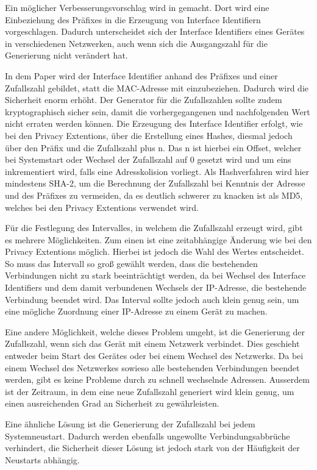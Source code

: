 \documentclass[a4paper, 12pt]{scrartcl}
\begin{document}
Ein möglicher Verbesserungsvorschlag wird in \cite{Paper} gemacht. Dort wird eine Einbeziehung des Präfixes in die Erzeugung von Interface Identifiern vorgeschlagen.
Dadurch unterscheidet sich der Interface Identifiers eines Gerätes in verschiedenen Netzwerken, auch wenn sich die Ausgangszahl für die Generierung nicht verändert hat.

In dem Paper wird der Interface Identifier anhand des Präfixes und einer Zufallszahl gebildet, statt die MAC-Adresse mit einzubeziehen.
Dadurch wird die Sicherheit enorm erhöht.
Der Generator für die Zufallszahlen sollte zudem kryptographisch sicher sein, damit die vorhergegangenen und nachfolgenden Wert nicht erraten werden können.
Die Erzeugung des Interface Identifier erfolgt, wie bei den Privacy Extentions, über die Erstellung eines Hashes, diesmal jedoch über den Präfix und die Zufallszahl plus n.
Das n ist hierbei ein Offset, welcher bei Systemstart oder Wechsel der Zufallszahl auf 0 gesetzt wird und um eins inkrementiert wird, falls eine Adresskolision vorliegt.
Als Hashverfahren wird hier mindestens SHA-2, um die Berechnung der Zufallszahl bei Kenntnis der Adresse und des Präfixes zu vermeiden, da es deutlich schwerer zu knacken ist als MD5, welches bei den Privacy Extentions verwendet wird.

Für die Festlegung des Intervalles, in welchem die Zufallszahl erzeugt wird, gibt es mehrere Möglichkeiten.
Zum einen ist eine zeitabhängige Änderung wie bei den Privacy Extentions möglich.
Hierbei ist jedoch die Wahl des Wertes entscheidet. So muss das Intervall so groß gewählt werden, dass die bestehenden Verbindungen nicht zu stark beeinträchtigt werden, da bei Wechsel des Interface Identifiers und dem damit verbundenen Wechsels der IP-Adresse, die bestehende Verbindung beendet wird.
Das Interval sollte jedoch auch klein genug sein, um eine mögliche Zuordnung einer IP-Adresse zu einem Gerät zu machen.

Eine andere Möglichkeit, welche dieses Problem umgeht, ist die Generierung der Zufallszahl, wenn sich das Gerät mit einem Netzwerk verbindet. Dies geschieht entweder beim Start des Gerätes oder bei einem Wechsel des Netzwerks. 
Da bei einem Wechsel des Netzwerkes sowieso alle bestehenden Verbindungen beendet werden, gibt es keine Probleme durch zu schnell wechselnde Adressen.
Ausserdem ist der Zeitraum, in dem eine neue Zufallszahl generiert wird klein genug, um einen ausreichenden Grad an Sicherheit zu gewährleisten.

Eine ähnliche Lösung ist die Generierung der Zufallszahl bei jedem Systemneustart. Dadurch werden ebenfalls ungewollte Verbindungsabbrüche verhindert, die Sicherheit dieser Lösung ist jedoch stark von der Häufigkeit der Neustarts abhängig. 
\end{document}
